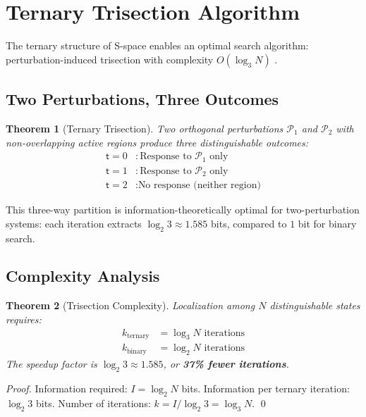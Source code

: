 \documentclass[twocolumn,10pt]{article}
\newtheorem{theorem}{Theorem}[section]
\theoremstyle{remark}
\newcommand{\tmark}{\mathsf{t}}
\begin{document}
\section{Ternary Trisection Algorithm}
\label{sec:trisection}

The ternary structure of S-space enables an optimal search algorithm: perturbation-induced trisection with complexity $O(\log_3 N)$ \cite{sachikonye2024trisection}.

\subsection{Two Perturbations, Three Outcomes}

\begin{theorem}[Ternary Trisection]
\label{thm:trisection}
Two orthogonal perturbations $\mathcal{P}_1$ and $\mathcal{P}_2$ with non-overlapping active regions produce three distinguishable outcomes:
\begin{align}
\tmark = 0 &: \text{Response to } \mathcal{P}_1 \text{ only} \\
\tmark = 1 &: \text{Response to } \mathcal{P}_2 \text{ only} \\
\tmark = 2 &: \text{No response (neither region)}
\end{align}
\end{theorem}

This three-way partition is information-theoretically optimal for two-perturbation systems: each iteration extracts $\log_2 3 \approx 1.585$ bits, compared to $1$ bit for binary search.

\subsection{Complexity Analysis}

\begin{theorem}[Trisection Complexity]
Localization among $N$ distinguishable states requires:
\begin{align}
k_{\text{ternary}} &= \log_3 N \text{ iterations} \\
k_{\text{binary}} &= \log_2 N \text{ iterations}
\end{align}
The speedup factor is $\log_2 3 \approx 1.585$, or \textbf{37\% fewer iterations}.
\end{theorem}

\begin{proof}
Information required: $I = \log_2 N$ bits. Information per ternary iteration: $\log_2 3$ bits. Number of iterations: $k = I / \log_2 3 = \log_3 N$. \qed
\end{proof}
\end{document}
